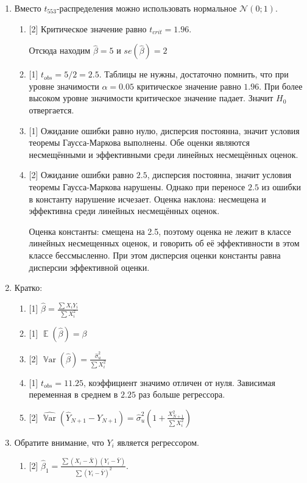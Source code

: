 \documentclass[12pt]{article}
\DeclareMathOperator{\Var}{\mathbb{V}ar}
\DeclareMathOperator{\E}{\mathbb{E}}
\def \hb{\hat{\beta}}
\def \hVar{\widehat{\Var}}
\def \cN{\mathcal{N}}
\theoremstyle{definition}
\begin{document}
\begin{enumerate}
    \item Вместо $t_{553}$-распределения можно использовать нормальное $\cN(0;1)$.
\begin{enumerate}
    \item {[2]} Критическое значение равно $t_{crit} = 1.96$. 

    Отсюда находим $\hb = 5$ и $se(\hb) = 2$
    \item {[1]} $t_{obs} = 5/2 = 2.5$. Таблицы не нужны, достаточно помнить, 
    что при уровне значимости $\alpha=0.05$ критическое значение равно $1.96$. 
    При более высоком уровне значимости критическое значение падает. Значит $H_0$ отвергается. 

    \item {[1]} Ожидание ошибки равно нулю, дисперсия постоянна, значит условия теоремы Гаусса-Маркова выполнены. 
    Обе оценки являются несмещёнными и эффективными среди линейных несмещённых оценок. 

    \item {[2]} Ожидание ошибки равно $2.5$, дисперсия постоянна, значит условия теоремы Гаусса-Маркова нарушены.
    Однако при переносе $2.5$ из ошибки в константу нарушение исчезает. 
    Оценка наклона: несмещена и эффективна среди линейных несмещённых оценок.

    Оценка константы: смещена на 2.5, поэтому оценка не лежит в классе линейных несмещенных оценок, 
    и говорить об её эффективности в этом классе бессмысленно. 
    При этом дисперсия оценки константы равна дисперсии эффективной оценки.
    
\end{enumerate}

\item Кратко:
\begin{enumerate}
    \item {[1]} $\hb = \frac{\sum X_i Y_i}{\sum X_i^2}$
    \item {[1]} $\E(\hb) = \beta$
    \item {[2]} $\Var(\hb) = \frac{\hat\sigma^2_u}{\sum X_i^2}$
    \item {[1]} $t_{obs} = 11.25$, коэффициент значимо отличен от нуля. 
    Зависимая переменная в среднем в $2.25$ раз больше регрессора.
    \item {[2]} $\hVar(\hat Y_{N+1} - Y_{N+1}) = \hat\sigma^2_u \left( 1 + \frac{X_{N+1}^2}{\sum X_i^2}  \right)$
\end{enumerate}

\item Обратите внимание, что $Y_i$ является регрессором. 
\begin{enumerate}
    \item {[2]} $\hb_1 = \frac{\sum (X_i - \bar X)(Y_i - \bar Y)}{\sum (Y_i - \bar Y)^2}$.
    

\end{enumerate}
\end{enumerate}
\end{document}
